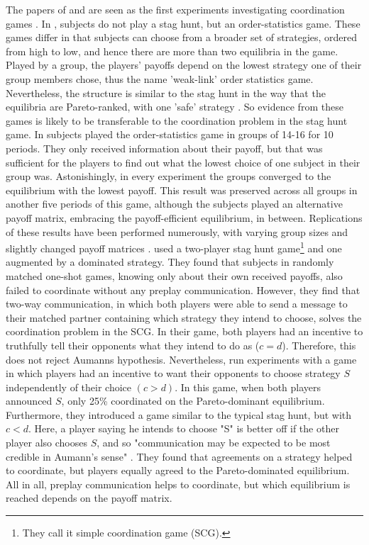 The papers of \textcite{van_huyck_tacit_1990} and 
\textcite{cooper_communication_1992} are seen as the first experiments 
investigating coordination games \parencite{devetag_when_2007}.
In \textcite{van_huyck_tacit_1990}, subjects do not play a stag
hunt, but an order-statistics game. These games differ in that subjects can
choose from a broader set of strategies, ordered from high to low, and 
hence there are more than two equilibria in the game. 
Played by a group, the players' payoffs depend on the lowest strategy one of 
their group members chose, thus the name 'weak-link' order statistics game. 
Nevertheless, the structure is similar to the stag hunt in the way 
that the equilibria are Pareto-ranked, with one 
'safe' strategy \parencite{devetag_when_2007}.
So evidence from these games is likely to be transferable to the 
coordination problem in the stag hunt game. 
In \textcite{van_huyck_tacit_1990} subjects played the order-statistics 
game in 
groups of 14-16 for 10 periods. They only received information about their 
payoff, but that was sufficient for the players to find out what the 
lowest choice of one subject in 
their group was. Astonishingly, in every experiment the groups converged
to the equilibrium with the lowest payoff. 
This result was preserved across all groups in another 
five periods of this game, although the subjects played an alternative payoff
matrix, embracing the payoff-efficient equilibrium, in between. 
Replications of these results have been performed numerously, with 
varying group sizes and slightly changed payoff matrices 
\parencite[6]{devetag_when_2007}. 
\textcite{cooper_communication_1992} used a
two-player stag hunt game\footnote{They call 
it simple coordination game (SCG).}  
and one augmented by a dominated strategy. They found that 
subjects in randomly matched one-shot games, knowing only about their own
received payoffs, also failed to coordinate without any preplay communication. 
However, they find that two-way communication, in which both players were
able to send a message to their matched partner containing which strategy
they intend to choose, solves the coordination problem in the SCG. 
In their game, both players had an incentive to truthfully tell their
opponents what they intend to do as ($c=d$). 
Therefore, this does not reject Aumanns hypothesis.
Nevertheless, \textcite{clark_when_2001} run experiments with a game in which
players had an incentive to want their opponents to choose strategy $S$ 
independently of their choice $(c > d)$.
In this game, when both players announced $S$, only 25\% coordinated on
the Pareto-dominant equilibrium. Furthermore, they introduced a game
similar to the typical stag hunt, but with $c<d$. Here, a player saying he 
intends to choose "S" is better off if the other player also chooses $S$, and
so "communication may be expected to be most credible in Aumann's sense" 
\parencite[508]{clark_when_2001}. They found that agreements on a strategy
helped to coordinate, but players equally agreed to the Pareto-dominated
equilibrium. 
All in all, preplay communication helps to coordinate, but which
equilibrium is reached depends on the payoff matrix.

